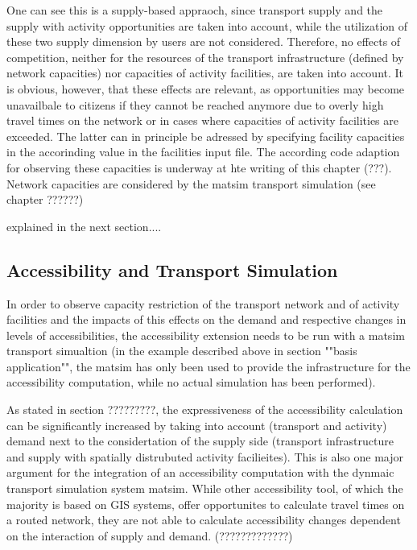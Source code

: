 One can see this is a supply-based appraoch, since transport supply and the supply with activity opportunities are taken into account, while the utilization of these two supply dimension by users are not considered. Therefore, no effects of competition, neither for the resources of the transport infrastructure (defined by network capacities) nor capacities of activity facilities, are taken into account. It is obvious, however, that these effects are relevant, as opportunities may become unavailbale to citizens if they cannot be reached anymore due to overly high travel times on the network or in cases where capacities of activity facilities are exceeded. The latter can in principle be adressed by specifying facility capacities in the accorinding value in the facilities input file. The according code adaption for observing these capacities is underway at hte writing of this chapter (???). Network capacities are considered by the \gls{matsim} transport simulation (see chapter ??????)

explained in the next section....



\subsection{Accessibility and Transport Simulation}
In order to observe capacity restriction of the transport network and of activity facilities and the impacts of this effects on the demand and respective changes in levels of accessibilities, the  accessibility extension needs to be run with a \gls{matsim} transport simualtion (in the example described above in section ""basis application"", the \gls{matsim} has only been used to provide the infrastructure for the accessibility computation, while no actual simulation has been performed).

As stated in section ?????????, the expressiveness of the accessibility calculation can be significantly increased by taking into account (transport and activity) demand next to the considertation of the supply side (transport infrastructure and supply with spatially distrubuted activity facilieites). This is also one major argument for the integration of an accessibility computation with the dynmaic transport simulation system \gls{matsim}. While other accessibility tool, of which the majority is based on GIS systems, offer opportunites to calculate travel times on a routed network, they are not able to calculate accessibility changes dependent on the interaction of supply and demand. (?????????????)


